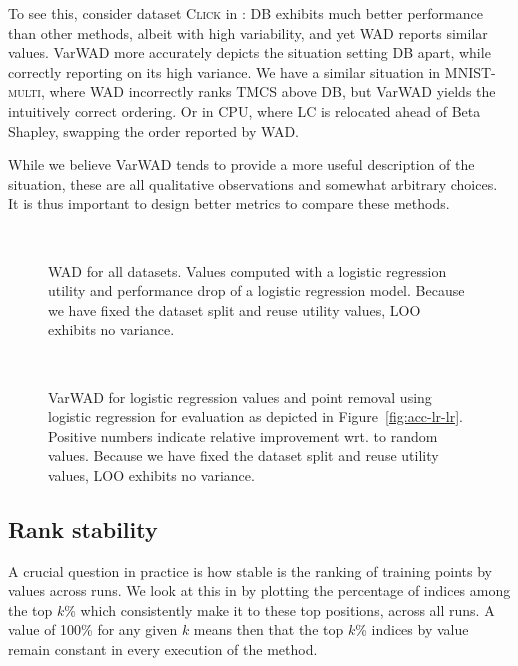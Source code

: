 \documentclass[10pt]{article}
\newcommand{\tmname}[1]{\textsc{#1}}
\begin{document}
To see this, consider dataset {\tmname{Click}} in
: DB exhibits much better
performance than other methods, albeit with high variability, and yet WAD
reports similar values. VarWAD more accurately depicts the situation setting
DB apart, while correctly reporting on its high variance. We have a similar
situation in {\tmname{MNIST-multi}}, where WAD incorrectly ranks TMCS above
DB, but VarWAD yields the intuitively correct ordering. Or in {\tmname{CPU}},
where LC is relocated ahead of Beta Shapley, swapping the order reported by
WAD.

While we believe VarWAD tends to provide a more useful description of the
situation, these are all qualitative observations and somewhat arbitrary
choices. It is thus important to design better metrics to compare these
methods.

\begin{figure}[h]
  \
  \caption{\label{fig:wad-lr-lr}WAD for all datasets. Values computed with a
  logistic regression utility and performance drop of a logistic regression
  model. Because we have fixed the dataset split and reuse utility values, LOO
  exhibits no variance.}
\end{figure}

\begin{figure}[h]
   \
  \caption{\label{fig:varwad-lr-lr}VarWAD for logistic regression values and
  point removal using logistic regression for evaluation as depicted in 
  Figure~\ref{fig:acc-lr-lr}. Positive numbers indicate relative improvement
  wrt. to random values. Because we have fixed the dataset split and reuse
  utility values, LOO exhibits no variance.}
\end{figure}

\subsection{Rank stability}\label{sec:rank-stability}

A crucial question in practice is how stable is the ranking of training points
by values across runs. We look at this in  by
plotting the percentage of indices among the top $k$\% which consistently make
it to these top positions, across all runs. A value of 100\% for any given $k$
means then that the top $k$\% indices by value remain constant in every
execution of the method.
\end{document}
